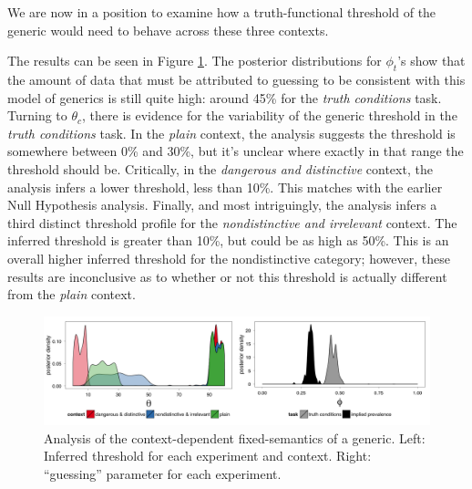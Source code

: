 \documentclass[10pt,letterpaper]{article}
\begin{document}

We are now in a position to examine how a truth-functional threshold of the generic would need to behave across these three contexts. 


The results can be seen in Figure \ref{fig:justFixed}. 
The posterior distributions for $\phi_{t}$'s show that the amount of data that must be attributed to guessing to be consistent with this model of generics is still quite high: around 45\% for the \emph{truth conditions} task. 
Turning to $\theta_{c}$, there is evidence for the variability of the generic threshold in the \emph{truth conditions} task. In the \emph{plain} context, the analysis suggests the threshold is somewhere between 0\% and 30\%, but it's unclear where exactly in that range the threshold should be. Critically, in the \emph{dangerous and distinctive} context, the analysis infers a lower threshold, less than 10\%. This matches with the earlier Null Hypothesis analysis. Finally, and most intriguingly, the analysis infers a third distinct threshold profile for the \emph{nondistinctive and irrelevant} context.  The inferred threshold is greater than 10\%, but could be as high as 50\%. This is an overall higher inferred threshold for the nondistinctive category; however, these results are inconclusive as to whether or not this threshold is actually different from the \emph{plain} context.



\begin{figure}
\centering
    \includegraphics[width=\columnwidth]{fixed_phis_thetas}
    \caption{Analysis of the context-dependent fixed-semantics of a generic. Left: Inferred threshold for each experiment and context. Right: ``guessing'' parameter for each experiment.}
  \label{fig:justFixed}
\end{figure}
\end{document}
